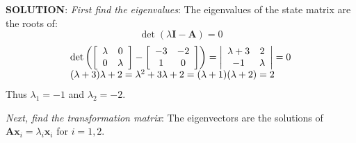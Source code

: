 \textbf{SOLUTION}: \emph{First find the eigenvalues}:
The eigenvalues of the state matrix are the roots of:
\[
\det(\lambda\mathbf{I}-\mathbf{A})=0
\]
\[
\begin{array}{l}
 \det \left( {\left[ {\begin{array}{*{20}c}
   \lambda  & 0  \\
   0 & \lambda   \\
\end{array}} \right] - \left[ {\begin{array}{*{20}c}
   { - 3} & { - 2}  \\
   1 & 0  \\
\end{array}} \right]} \right) = \left| {\begin{array}{*{20}c}
   {\lambda  + 3} & 2  \\
   { - 1} & \lambda   \\
\end{array}} \right| = 0 \\
 (\lambda  + 3)\lambda  + 2 = \lambda ^2  + 3\lambda  + 2 = (\lambda  + 1)(\lambda  + 2) = 2 \\
 \end{array}
\]
Thus $\lambda_1=-1$ and $\lambda_2=-2$.

\emph{Next, find the transformation matrix}: The eigenvectors are the solutions of $\mathbf{A}\mathbf{x}_i=\lambda_i\mathbf{x}_i$ for $i=1,2$.

